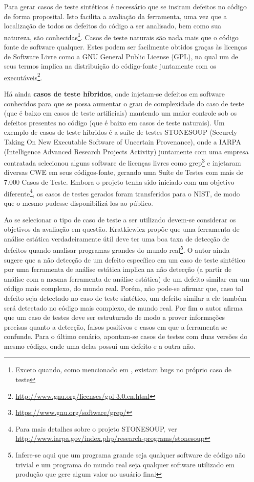   Para gerar casos de teste sintéticos é necessário que se insiram defeitos no código de forma proposital. Isto facilita a avaliação da ferramenta, uma vez que a localização de todos os defeitos do código a ser analisado, bem como sua natureza, são conhecidas\footnote{Exceto quando, como mencionado em \cite{pascal}, existam bugs no próprio caso de teste}. Casos de teste naturais são nada mais que o código fonte de software qualquer. Estes podem ser facilmente obtidos graças às licenças de Software Livre como a GNU General Public License (GPL),  na qual um de seus termos implica na distribuição do código-fonte juntamente com os executáveis\footnote{\url{http://www.gnu.org/licenses/gpl-3.0.en.html}}.

  Há ainda \textbf{casos de teste híbridos}, onde injetam-se defeitos em software conhecidos para que se possa aumentar o grau de complexidade do caso de teste (que é baixo em casos de teste artificiais) mantendo um maior controle sob os defeitos presentes no código (que é baixo em casos de teste naturais). Um exemplo de casos de teste híbridos é a suíte de testes STONESOUP (Securely Taking On New Executable Software of Uncertain Provenance), onde a IARPA (Intelligence Advanced Research Projects Activity) juntamente com uma empresa contratada selecionou alguns software de licenças livres como grep\footnote{\url{https://www.gnu.org/software/grep/}} e injetaram diversas CWE em seus códigos-fonte, gerando uma Suíte de Testes com mais de 7.000 Casos de Teste. Embora o projeto tenha sido iniciado com um objetivo diferente\footnote{Para mais detalhes sobre o projeto STONESOUP, ver \url{http://www.iarpa.gov/index.php/research-programs/stonesoup}}, os casos de testes gerados foram transferidos para o NIST, de modo que o mesmo pudesse disponibilizá-los ao público.

  Ao se selecionar o tipo de caso de teste a ser utilizado devem-se considerar os objetivos da avaliação em questão. Kratkiewicz \cite{harvard} propõe que uma ferramenta de análise estática verdadeiramente útil deve ter uma boa taxa de detecção de defeitos quando  analisar programas grandes do mundo real\footnote{Infere-se aqui que um programa grande seja qualquer software de código não trivial e um programa do mundo real seja qualquer software utilizado em produção que gere algum valor ao usuário final}. O autor ainda sugere que a não detecção de um defeito específico em um caso de teste sintético por uma ferramenta de análise estática implica na não detecção (a partir de análise com a mesma ferramenta de análise estática) de um defeito similar em um código mais complexo, do mundo real. Porém, não pode-se afirmar que, caso tal defeito seja detectado no caso de teste sintético, um defeito similar a ele também será detectado no código mais complexo, de mundo real. Por fim o autor afirma que um caso de testes deve ser estruturado de modo a prover informações precisas quanto a detecção, falsos positivos e casos em que a ferramenta se confunde. Para o último cenário, apontam-se casos de testes com duas versões do mesmo código, onde uma delas possui um defeito e a outra não.

